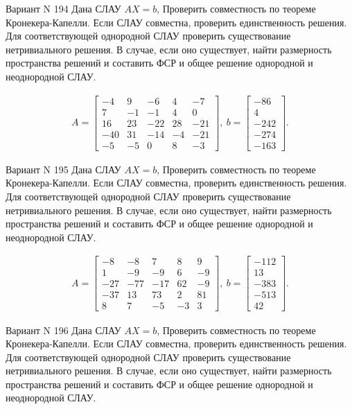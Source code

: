 \documentclass[11pt]{report}
\begin{document}
Вариант N 194
Дана СЛАУ $AX = b$,
Проверить совместность по теореме Кронекера-Капелли. Если СЛАУ совместна, проверить единственность решения.
Для соответствующей однородной СЛАУ проверить существование нетривиального решения. В случае, если оно существует,
найти размерность пространства решений и составить ФСР и общее решение однородной  и неоднородной СЛАУ.


\begin{align*}
 A = \left[\begin{matrix}-4 & 9 & -6 & 4 & -7\\7 & -1 & -1 & 4 & 0\\16 & 23 & -22 & 28 & -21\\-40 & 31 & -14 & -4 & -21\\-5 & -5 & 0 & 8 & -3\end{matrix}\right],
\ b = \left[\begin{matrix}-86\\4\\-242\\-274\\-163\end{matrix}\right]. 
 \end{align*}

Вариант N 195
Дана СЛАУ $AX = b$,
Проверить совместность по теореме Кронекера-Капелли. Если СЛАУ совместна, проверить единственность решения.
Для соответствующей однородной СЛАУ проверить существование нетривиального решения. В случае, если оно существует,
найти размерность пространства решений и составить ФСР и общее решение однородной  и неоднородной СЛАУ.


\begin{align*}
 A = \left[\begin{matrix}-8 & -8 & 7 & 8 & 9\\1 & -9 & -9 & 6 & -9\\-27 & -77 & -17 & 62 & -9\\-37 & 13 & 73 & 2 & 81\\8 & 7 & -5 & -3 & 3\end{matrix}\right],
\ b = \left[\begin{matrix}-112\\13\\-383\\-513\\42\end{matrix}\right]. 
 \end{align*}

Вариант N 196
Дана СЛАУ $AX = b$,
Проверить совместность по теореме Кронекера-Капелли. Если СЛАУ совместна, проверить единственность решения.
Для соответствующей однородной СЛАУ проверить существование нетривиального решения. В случае, если оно существует,
найти размерность пространства решений и составить ФСР и общее решение однородной  и неоднородной СЛАУ.
\end{document}
